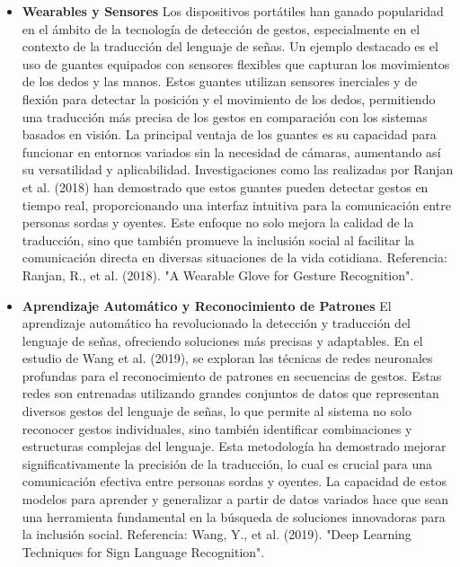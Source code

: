 \begin{itemize}
\item \textbf{Wearables y Sensores} \newline 
Los dispositivos portátiles han ganado popularidad en el ámbito de la tecnología de detección de gestos, especialmente en el contexto de la traducción del lenguaje de señas. Un ejemplo destacado es el uso de guantes equipados con sensores flexibles que capturan los movimientos de los dedos y las manos. Estos guantes utilizan sensores inerciales y de flexión para detectar la posición y el movimiento de los dedos, permitiendo una traducción más precisa de los gestos en comparación con los sistemas basados en visión. La principal ventaja de los guantes es su capacidad para funcionar en entornos variados sin la necesidad de cámaras, aumentando así su versatilidad y aplicabilidad. Investigaciones como las realizadas por Ranjan et al. (2018) han demostrado que estos guantes pueden detectar gestos en tiempo real, proporcionando una interfaz intuitiva para la comunicación entre personas sordas y oyentes. Este enfoque no solo mejora la calidad de la traducción, sino que también promueve la inclusión social al facilitar la comunicación directa en diversas situaciones de la vida cotidiana.
\newline
Referencia: Ranjan, R., et al. (2018). "A Wearable Glove for Gesture Recognition". \cite{mdpi_sensors_18_367}

\item \textbf{Aprendizaje Automático y Reconocimiento de Patrones} \newline 
El aprendizaje automático ha revolucionado la detección y traducción del lenguaje de señas, ofreciendo soluciones más precisas y adaptables. En el estudio de Wang et al. (2019), se exploran las técnicas de redes neuronales profundas para el reconocimiento de patrones en secuencias de gestos. Estas redes son entrenadas utilizando grandes conjuntos de datos que representan diversos gestos del lenguaje de señas, lo que permite al sistema no solo reconocer gestos individuales, sino también identificar combinaciones y estructuras complejas del lenguaje. Esta metodología ha demostrado mejorar significativamente la precisión de la traducción, lo cual es crucial para una comunicación efectiva entre personas sordas y oyentes. La capacidad de estos modelos para aprender y generalizar a partir de datos variados hace que sean una herramienta fundamental en la búsqueda de soluciones innovadoras para la inclusión social. \newline
Referencia: Wang, Y., et al. (2019). "Deep Learning Techniques for Sign Language Recognition". \cite{mdpi_sensors_18_367}


\end{itemize}
